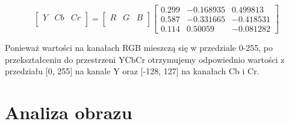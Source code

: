 \[
\begin{bmatrix}
    Y & Cb & Cr \\
\end{bmatrix}
=
\begin{bmatrix}
    R & G & B \\
\end{bmatrix}
\begin{bmatrix}
    0.299 & -0.168935 & 0.499813 \\
    0.587 & -0.331665 & -0.418531 \\
    0.114 & 0.50059 & -0.081282 
\end{bmatrix}
\]


Ponieważ wartości na kanałach RGB mieszczą się w przedziale 0-255, po przekształceniu do przestrzeni YCbCr otrzymujemy odpowiednio wartości z przedziału [0, 255] na kanale Y oraz [-128, 127] na kanałach Cb i Cr.
\section{Analiza obrazu}  
